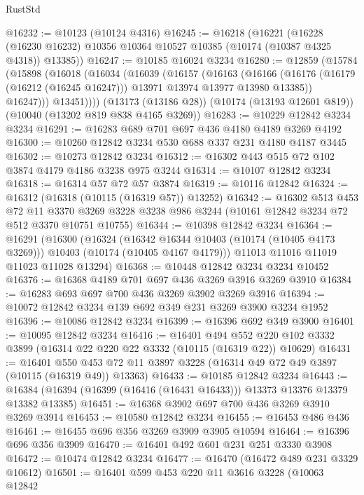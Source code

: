 \begin{lexlean}{RustStd}
\begin{coremodule}
@16232 := @10123 (@10124 @4316)
@16245 := @16218
    (@16221
      (@16228 (@16230 @16232) @10356 @10364 @10527 @10385 (@10174 (@10387 @4325 @4318)) @13385))
@16247 := @10185 @16024 @3234
@16280 := @12859
    (@15784
      (@15898
        (@16018
          (@16034
            (@16039
              (@16157
                (@16163
                  (@16166
                    (@16176 (@16179 (@16212 (@16245 @16247))) @13971 @13974 @13977 @13980 @13385))
                  @16247)))
            @13451))))
    (@13173 (@13186 @28))
    (@10174 (@13193 @12601 @819))
    (@10040 (@13202 @819 @838 @4165 @3269))
@16283 := @10229 @12842 @3234 @3234
@16291 := @16283 @689 @701 @697 @436 @4180 @4189 @3269 @4192
@16300 := @10260 @12842 @3234 @530 @688 @337 @231 @4180 @4187 @3445
@16302 := @10273 @12842 @3234
@16312 := @16302 @443 @515 @72 @102 @3874 @4179 @4186 @3238 @975 @3244
@16314 := @10107 @12842 @3234
@16318 := @16314 @57 @72 @57 @3874
@16319 := @10116 @12842
@16324 := @16312 (@16318 (@10115 (@16319 @57)) @13252)
@16342 := @16302
    @513
    @453
    @72
    @11
    @3370
    @3269
    @3228
    @3238
    @986
    @3244
    (@10161 @12842 @3234 @72 @512 @3370 @10751 @10755)
@16344 := @10398 @12842 @3234
@16364 := @16291
    (@16300
      (@16324
        (@16342 @16344 @10403 (@10174 (@10405 @4173 @3269)))
        @10403
        (@10174 (@10405 @4167 @4179)))
      @11013
      @11016
      @11019
      @11023
      @11028
      @13294)
@16368 := @10448 @12842 @3234 @3234 @10452
@16376 := @16368 @4189 @701 @697 @436 @3269 @3916 @3269 @3910
@16384 := @16283 @693 @697 @700 @436 @3269 @3902 @3269 @3916
@16394 := @10072 @12842 @3234 @139 @692 @349 @231 @3269 @3900 @3234 @1952
@16396 := @10086 @12842 @3234
@16399 := @16396 @692 @349 @3900
@16401 := @10095 @12842 @3234
@16416 := @16401
    @494
    @552
    @220
    @102
    @3332
    @3899
    (@16314 @22 @220 @22 @3332 (@10115 (@16319 @22)) @10629)
@16431 := @16401
    @550
    @453
    @72
    @11
    @3897
    @3228
    (@16314 @49 @72 @49 @3897 (@10115 (@16319 @49)) @13363)
@16433 := @10185 @12842 @3234
@16443 := @16384 (@16394 (@16399 (@16416 (@16431 @16433))) @13373 @13376 @13379 @13382 @13385)
@16451 := @16368 @3902 @697 @700 @436 @3269 @3910 @3269 @3914
@16453 := @10580 @12842 @3234
@16455 := @16453 @486 @436
@16461 := @16455 @696 @356 @3269 @3909 @3905 @10594
@16464 := @16396 @696 @356 @3909
@16470 := @16401 @492 @601 @231 @251 @3330 @3908
@16472 := @10474 @12842 @3234
@16477 := @16470 (@16472 @489 @231 @3329 @10612)
@16501 := @16401
    @599
    @453
    @220
    @11
    @3616
    @3228
    (@10063
      @12842

\end{coremodule}
\end{lexlean}
